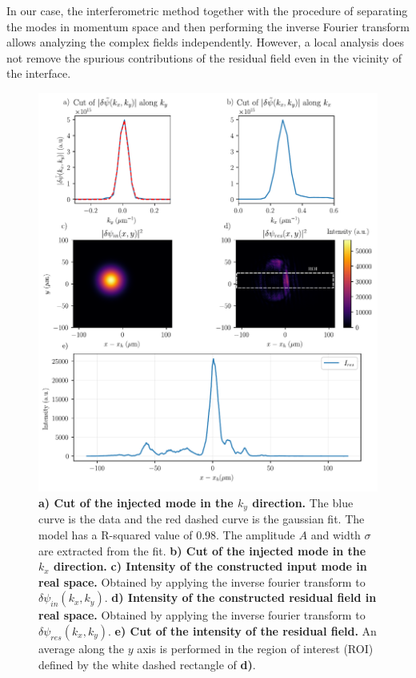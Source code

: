 In our case, the interferometric method together with the procedure of separating the modes in momentum space and then performing the inverse Fourier transform allows analyzing the complex fields independently. However, a local analysis does not remove the spurious contributions of the residual field even in the vicinity of the interface.


\begin{figure}
    \centering
    \includegraphics[width=1\textwidth]{chap_stimulated_hawking/fig/fit_input_mode.pdf}
    \caption{\textbf{a) Cut of the injected mode in the $k_y$ direction.} The blue curve is the data and the red dashed curve is the gaussian fit. The model has a R-squared value of 0.98. The amplitude $A$ and width $\sigma$ are extracted from the fit. 
    \textbf{b) Cut of the injected mode in the $k_x$ direction.}
    \textbf{c) Intensity of the constructed input mode in real space.} Obtained by applying the inverse fourier transform to $\delta \psi_{in}(k_x,k_y)$.
    \textbf{d) Intensity of the constructed residual field in real space.} Obtained by applying the inverse fourier transform to $\delta \psi_{res}(k_x,k_y)$.
    \textbf{e) Cut of the intensity of the residual field.} An average along the $y$ axis is performed in the region of interest (ROI) defined by the white dashed rectangle of \textbf{d)}.}
    \label{fig:fit_input_mode}
\end{figure}


